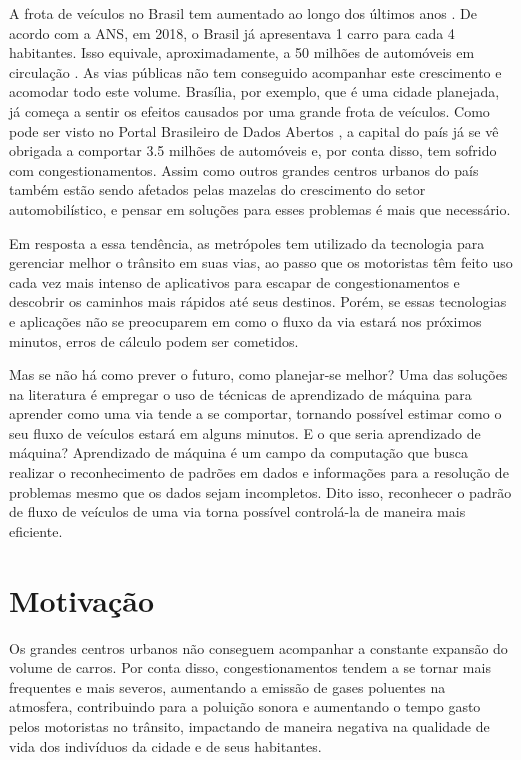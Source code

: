A frota  de  veículos no Brasil tem aumentado ao longo  dos últimos anos \cite{mapa_moto2019v2}. De acordo com a \acrfull{ANS}, em 2018, o Brasil já apresentava 1 carro para cada 4 habitantes. Isso equivale, aproximadamente, a 50 milhões de automóveis em circulação \cite{G1}. As vias públicas não tem conseguido acompanhar este crescimento e acomodar todo este volume. Brasília, por exemplo, que é uma cidade planejada, já começa a sentir os efeitos causados por uma grande frota de veículos. Como pode ser visto no Portal Brasileiro de Dados Abertos \cite{detran_2018}, a capital do país já se vê obrigada a comportar 3.5 milhões de automóveis e, por conta disso, tem sofrido com congestionamentos. Assim como outros grandes centros urbanos do país também estão sendo afetados pelas mazelas do crescimento do setor automobilístico, e pensar em soluções para esses problemas é mais que necessário.

Em resposta a essa tendência, as metrópoles tem utilizado da tecnologia para gerenciar melhor o trânsito em suas vias, ao passo que os motoristas têm feito uso cada vez mais intenso de aplicativos para escapar de congestionamentos e descobrir os caminhos mais rápidos até seus destinos. Porém, se essas tecnologias e aplicações não se preocuparem em como o fluxo da via estará nos próximos minutos, erros de cálculo podem ser cometidos.

Mas se não há como prever o futuro, como planejar-se melhor? Uma das soluções na literatura é empregar o uso de técnicas de aprendizado de máquina para aprender como uma via tende a se comportar, tornando possível estimar como o seu fluxo de veículos estará em alguns minutos. E o que seria aprendizado de máquina? Aprendizado de máquina é um campo da computação que busca realizar o reconhecimento de padrões em dados e informações para a resolução de problemas mesmo que os dados sejam incompletos. Dito isso, reconhecer o padrão de fluxo de veículos de uma via torna possível controlá-la de maneira mais eficiente.

\section{Motivação}

Os grandes centros urbanos não conseguem acompanhar a constante expansão do volume de carros. Por conta disso, congestionamentos tendem a se tornar mais frequentes e mais severos, aumentando a emissão de gases poluentes na atmosfera, contribuindo para a poluição sonora e aumentando o tempo gasto pelos motoristas no trânsito, impactando de maneira negativa na qualidade de vida dos indivíduos da cidade e de seus habitantes.

